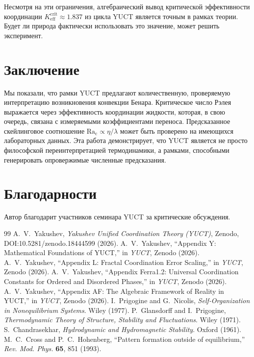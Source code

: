 \documentclass[12pt,a4paper]{article}
\begin{document}
	Несмотря на эти ограничения, алгебраический вывод критической эффективности координации \(K_{\mathrm{eff}}^{\mathrm{crit}} \approx 1.837\) из цикла YUCT является точным в рамках теории. Будет ли природа фактически использовать это значение, может решить эксперимент.
	
	\section{Заключение}
	
	Мы показали, что рамки YUCT предлагают количественную, проверяемую интерпретацию возникновения конвекции Бенара. Критическое число Рэлея выражается через эффективность координации жидкости, которая, в свою очередь, связана с измеряемыми коэффициентами переноса. Предсказанное скейлинговое соотношение \(\mathrm{Ra_c} \propto \eta/\lambda\) может быть проверено на имеющихся лабораторных данных. Эта работа демонстрирует, что YUCT является не просто философской переинтерпретацией термодинамики, а рамками, способными генерировать опровержимые численные предсказания.
	
	\section*{Благодарности}
	Автор благодарит участников семинара YUCT за критические обсуждения.
	
	\begin{thebibliography}{99}
		 A.~V.~Yakushev, \emph{Yakushev Unified Coordination Theory (YUCT)}, Zenodo, DOI:10.5281/zenodo.18444599 (2026).
		 A.~V.~Yakushev, ``Appendix Y: Mathematical Foundations of YUCT,'' in \emph{YUCT}, Zenodo (2026).
		 A.~V.~Yakushev, ``Appendix L: Fractal Coordination Error Scaling,'' in \emph{YUCT}, Zenodo (2026).
		 A.~V.~Yakushev, ``Appendix Ferra1.2: Universal Coordination Constants for Ordered and Disordered Phases,'' in \emph{YUCT}, Zenodo (2026).
		 A.~V.~Yakushev, ``Appendix AF: The Algebraic Framework of Reality in YUCT,'' in \emph{YUCT}, Zenodo (2026).
		 I.~Prigogine and G.~Nicolis, \emph{Self‑Organization in Nonequilibrium Systems}. Wiley (1977).
		 P.~Glansdorff and I.~Prigogine, \emph{Thermodynamic Theory of Structure, Stability and Fluctuations}. Wiley (1971).
		 S.~Chandrasekhar, \emph{Hydrodynamic and Hydromagnetic Stability}. Oxford (1961).
		 M.~C.~Cross and P.~C.~Hohenberg, ``Pattern formation outside of equilibrium,'' \emph{Rev. Mod. Phys.} \textbf{65}, 851 (1993).
	\end{thebibliography}
	
\end{document}
